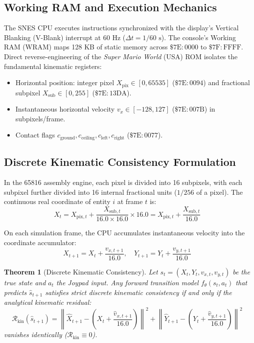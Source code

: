 \documentclass[10pt,twocolumn,letterpaper]{article}
\newtheorem{theorem}{Theorem}
\begin{document}
\subsection{Working RAM and Execution Mechanics}
The SNES CPU executes instructions synchronized with the display's Vertical Blanking (V-Blank) interrupt at 60 Hz ($\Delta t = 1/60\text{ s}$). The console's Working RAM (WRAM) maps 128 KB of static memory across $\$7\text{E}:0000$ to $\$7\text{F}:\text{FFFF}$. Direct reverse-engineering of the \textit{Super Mario World} (USA) ROM isolates the fundamental kinematic registers:
\begin{itemize}
    \item Horizontal position: integer pixel $X_{\text{pix}} \in [0, 65535]$ ($\$7\text{E}:0094$) and fractional subpixel $X_{\text{sub}} \in [0, 255]$ ($\$7\text{E}:13\text{DA}$).
    \item Instantaneous horizontal velocity $v_x \in [-128, 127]$ ($\$7\text{E}:007\text{B}$) in subpixels/frame.
    \item Contact flags $c_{\text{ground}}, c_{\text{ceiling}}, c_{\text{left}}, c_{\text{right}}$ ($\$7\text{E}:0077$).
\end{itemize}

\subsection{Discrete Kinematic Consistency Formulation}
In the 65816 assembly engine, each pixel is divided into 16 subpixels, with each subpixel further divided into 16 internal fractional units ($1/256$ of a pixel). The continuous real coordinate of entity $i$ at frame $t$ is:
\begin{equation}
    X_t = X_{\text{pix}, t} + \frac{X_{\text{sub}, t}}{16.0 \times 16.0} \times 16.0 = X_{\text{pix}, t} + \frac{X_{\text{sub}, t}}{16.0}
\end{equation}

On each simulation frame, the CPU accumulates instantaneous velocity into the coordinate accumulator:
\begin{equation}
    X_{t+1} = X_t + \frac{v_{x, t+1}}{16.0}, \quad Y_{t+1} = Y_t + \frac{v_{y, t+1}}{16.0}
\end{equation}

\begin{theorem}[Discrete Kinematic Consistency]
Let $s_t = (X_t, Y_t, v_{x, t}, v_{y, t})$ be the true state and $a_t$ the Joypad input. Any forward transition model $f_\theta(s_t, a_t)$ that predicts $\hat{s}_{t+1}$ satisfies strict discrete kinematic consistency if and only if the analytical kinematic residual:
\begin{equation}
    \mathcal{R}_{\text{kin}}(\hat{s}_{t+1}) = \left\| \hat{X}_{t+1} - \left( X_t + \frac{\hat{v}_{x, t+1}}{16.0} \right) \right\|^2 + \left\| \hat{Y}_{t+1} - \left( Y_t + \frac{\hat{v}_{y, t+1}}{16.0} \right) \right\|^2
\end{equation}
vanishes identically ($\mathcal{R}_{\text{kin}} \equiv 0$).
\end{theorem}
\end{document}
